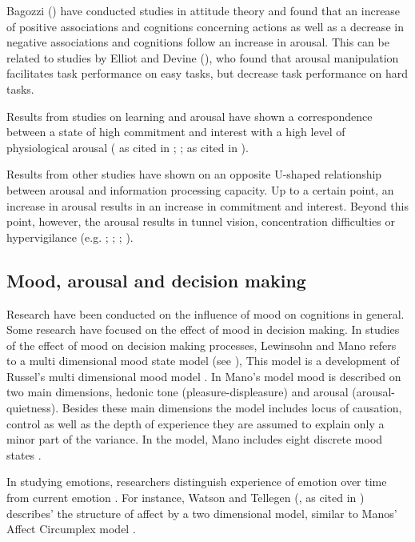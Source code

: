 Bagozzi (\citeyear{Bagozzi95}) have conducted studies in attitude
theory and  found 
that an increase of positive associations and cognitions concerning
actions as well as a decrease in negative associations and cognitions
follow an increase in arousal. This can be related to studies by
Elliot and Devine (\citeyear{ElliotDevine94}), who found that arousal
manipulation facilitates task performance on easy tasks, but decrease
task performance on hard tasks.

Results from studies on learning and arousal have shown a
correspondence between a state of high commitment and interest with a
high level of physiological arousal (\cite{Berlyne60} as cited in
\cite{Izard77}; \cite{Berlyne67}; as cited in \cite{Izard77}).

Results from other studies have shown on an opposite U-shaped
relationship between arousal and information processing capacity.  Up
to a certain point, an increase in arousal results in an increase in
commitment and interest.  Beyond this point, however, the arousal
results in tunnel vision, concentration difficulties or hypervigilance
(e.g. \cite{Easterbrook59}; \cite{JanisMann77}; \cite{LewinsohnMano93};
\cite{StoneKadous94}).



\subsection{Mood, arousal and decision making}

Research have been conducted on the influence of mood on cognitions in
general.  Some research have focused on the effect of mood in decision
making.  In studies of the effect of mood on decision making
processes, Lewinsohn and Mano refers to a multi dimensional mood state
model \parencite{LewinsohnMano93, Mano94} (see
), This model 
is a development of Russel's multi dimensional mood model
\parencite{Russel78}. In Mano's model mood is described on two main dimensions,
hedonic tone (pleasure-displeasure) and arousal (arousal-quietness).
Besides these main dimensions the model includes locus of causation,
control as well as the depth of experience they are assumed to explain
only a minor part of the variance.  In the model, Mano includes eight
discrete mood states \parencite{Mano94}.







In studying emotions, researchers distinguish experience of emotion
over time from current emotion \parencite{FiskeTaylor91}. For instance,
Watson and Tellegen (\cite{WatsonTellegen85}, as cited in \cite{FiskeTaylor91})
describes' the structure of affect by a two dimensional model, similar
to Manos' Affect Circumplex model \parencite{Mano94}.

